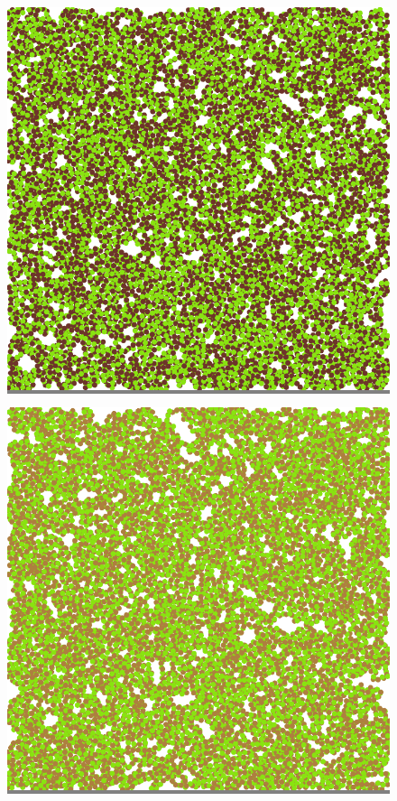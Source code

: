 \documentclass{article}
\begin{document}
\begin{figure}
\begin{minipage}{0.3\textwidth}
    \end{minipage}
    \hspace{\fill}
    \begin{minipage}{0.3\textwidth}
    \colorbox{gray}{\includegraphics[width=\linewidth]{./images/square_5_bb_0.png}}
    \end{minipage}
    \hspace{\fill}
    \begin{minipage}{0.3\textwidth}
    \colorbox{gray}{\includegraphics[width=\linewidth]{./images/square_5_bb_1.png}}

\end{minipage}
\end{figure}
\end{document}
